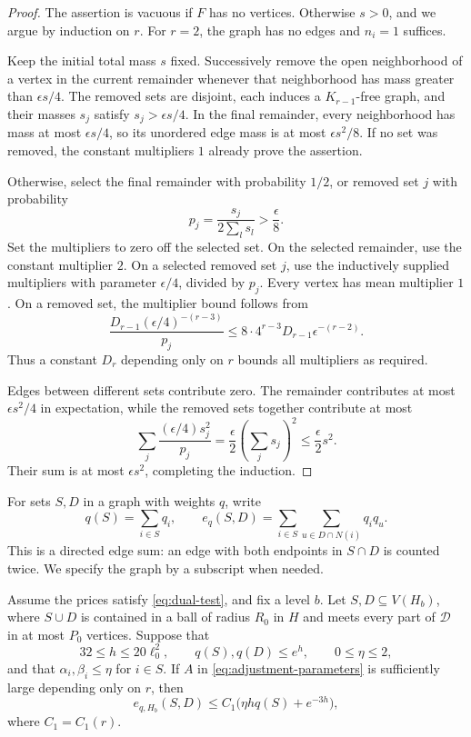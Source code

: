 \begin{proof}
The assertion is vacuous if $F$ has no vertices.  Otherwise $s>0$,
and we argue by induction on $r$.  For $r=2$, the graph has no edges
and $n_i=1$ suffices.

Keep the initial total mass $s$ fixed.  Successively remove the open
neighborhood of a vertex in the current remainder whenever that
neighborhood has mass greater than $\epsilon s/4$.  The removed sets
are disjoint, each induces a $K_{r-1}$-free graph, and their masses
$s_j$ satisfy $s_j>\epsilon s/4$.  In the final remainder, every
neighborhood has mass at most $\epsilon s/4$, so its unordered edge
mass is at most $\epsilon s^2/8$.  If no set was removed, the constant
multipliers $1$ already prove the assertion.

Otherwise, select the final remainder with probability $1/2$, or
removed set $j$ with probability
\[
 p_j=\frac{s_j}{2\sum_l s_l}>\frac\epsilon8.
\]
Set the multipliers to zero off the selected set.  On the selected
remainder, use the constant multiplier $2$.  On a selected removed set
$j$, use the inductively supplied multipliers with parameter
$\epsilon/4$, divided by $p_j$.  Every vertex has mean multiplier
$1$.  On a removed set, the multiplier bound follows from
\[
 \frac{D_{r-1}(\epsilon/4)^{-(r-3)}}{p_j}
 \le 8\cdot4^{r-3}D_{r-1}\epsilon^{-(r-2)}.
\]
Thus a constant $D_r$ depending only on $r$ bounds all multipliers as
required.

Edges between different sets contribute zero.  The remainder
contributes at most $\epsilon s^2/4$ in expectation, while the removed
sets together contribute at most
\[
 \sum_j\frac{(\epsilon/4)s_j^2}{p_j}
 =\frac\epsilon2\left(\sum_j s_j\right)^2
 \le\frac\epsilon2s^2.
\]
Their sum is at most $\epsilon s^2$, completing the induction.
\end{proof}

For sets $S,D$ in a graph with weights $q$, write
\[
 q(S)=\sum_{i\in S}q_i,\qquad
 e_q(S,D)=\sum_{i\in S}\sum_{u\in D\cap N(i)}q_iq_u.
\]
This is a directed edge sum: an edge with both endpoints in $S\cap D$
is counted twice.  We specify the graph by a subscript when needed.

\begin{lemma}
\label{lem:local-cross}
Assume the prices satisfy \eqref{eq:dual-test}, and fix a level $b$.
Let $S,D\subseteq V(H_b)$, where $S\cup D$ is contained in a ball of
radius $R_0$ in $H$ and meets every part of $\mathcal D$ in at most
$P_0$ vertices.  Suppose that
\[
 32\le h\le20\ell_0^2,\qquad q(S),q(D)\le e^h,
 \qquad 0\le\eta\le2,
\]
and that $\alpha_i,\beta_i\le\eta$ for $i\in S$.  If $A$ in
\eqref{eq:adjustment-parameters} is sufficiently large depending only
on $r$, then
\begin{equation}
\label{eq:local-cross}
 e_{q,H_b}(S,D)\le C_1\bigl(\eta hq(S)+e^{-3h}\bigr),
\end{equation}
where $C_1=C_1(r)$.
\end{lemma}

